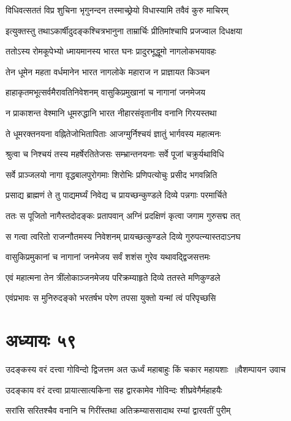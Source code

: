 \twolineshloka
{विधिवत्सततं विप्र शुचिना भृगुनन्दन}
{तस्माच्छ्रेयो विधास्यामि तवैवं कुरु माचिरम्}


\twolineshloka
{इत्युक्तस्तु तथाऽकार्षीदुदङ्कश्चित्रभानुना}
{ताम्रार्चिः प्रीतिमांश्चापि प्रजज्वाल दिधक्षया}


\twolineshloka
{ततोऽस्य रोमकूपेभ्यो ध्मायमानस्य भारत}
{घनः प्रादुरभूद्धूमो नागलोकभयावहः}


\twolineshloka
{तेन धूमेन महता वर्धमानेन भारत}
{नागलोके महाराज न प्राज्ञायत किञ्चन}


\twolineshloka
{हाहाकृतमभूत्सर्वमैरावतिनिवेशनम्}
{वासुकिप्रमुखानां च नागानां जनमेजय}


\twolineshloka
{न प्राकाशन्त वेश्मानि धूमरुद्धानि भारत}
{नीहारसंवृतानीव वनानि गिरयस्तथा}


\twolineshloka
{ते धूमरक्तनयना वह्नितेजोभितापिताः}
{आजग्मुर्निश्चयं ज्ञातुं भार्गवस्य महात्मनः}


\twolineshloka
{श्रुत्वा च निश्चयं तस्य महर्षेरतितेजसः}
{सम्भ्रान्तनयनाः सर्वे पूजां चक्रुर्यथाविधि}


\twolineshloka
{सर्वे प्राञ्जलयो नागा वृद्धबालपुरोगमाः}
{शिरोभिः प्रणिपत्योचुः प्रसीद भगवन्निति}


\twolineshloka
{प्रसाद्य ब्राह्मणं ते तु पाद्यमर्घ्यं निवेद्य च}
{प्रायच्छन्कुण्डले दिव्ये पन्नगाः परमार्चिते}


\twolineshloka
{ततः स पूजितो नागैस्तदोदङ्कः प्रतापवान्}
{अग्निं प्रदक्षिणं कृत्वा जगाम गुरुसद्म तत्}


\twolineshloka
{स गत्वा त्वरितो राजन्गौतमस्य निवेशनम्}
{प्रायच्छत्कुण्डले दिव्ये गुरुपत्न्यास्तदाऽनघ}


\twolineshloka
{वासुकिप्रमुकानां च नागानां जनमेजय}
{सर्वं शशंस गुरेव यथावद्द्विजसत्तमः}


\twolineshloka
{एवं महात्मना तेन त्रींलोकाञ्जनमेजय}
{परिक्रम्याहृते दिव्ये ततस्ते मणिकुण्डले}


\threelineshloka
{एवंप्रभावः स मुनिरुदङ्को भरतर्षभ}
{परेण तपसा युक्तो यन्मां त्वं परिपृच्छसि}
{}


\chapter{अध्यायः ५९}
\threelineshloka
{उदङ्कस्य वरं दत्त्वा गोविन्दो द्विजत्तम}
{अत ऊर्ध्वं महाबाहुः किं चकार महायशाः ॥वैशम्पायन उवाच}
{}


\twolineshloka
{उदङ्काय वरं दत्त्वा प्रायात्सात्यकिना सह}
{द्वारकामेव गोविन्दः शीघ्रवेगैर्महाहयैः}


\twolineshloka
{सरांसि सरितश्चैव वनानि च गिरींस्तथा}
{अतिक्रम्याससादाथ रम्यां द्वारवतीं पुरीम्}


